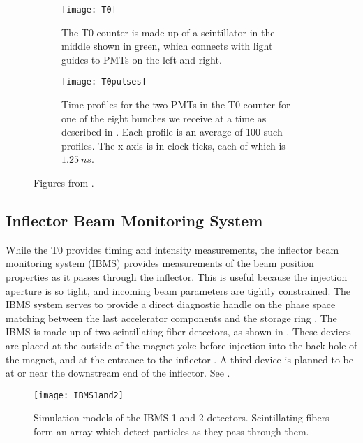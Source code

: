 \begin{figure}[]
\centering
    \begin{subfigure}[t]{0.45\textwidth}
        \centering
        \texttt{[image: T0]}
        \caption{The T0 counter is made up of a scintillator in the middle shown in green, which connects with light guides to PMTs on the left and right.}
    \label{fig:T0counter}
    \end{subfigure}%
    \hspace{1cm}
    \begin{subfigure}[t]{0.45\textwidth}
        \centering
        \texttt{[image: T0pulses]}
        \caption{Time profiles for the two PMTs in the T0 counter for one of the eight bunches we receive at a time as described in . Each profile is an average of 100 such profiles. The x axis is in clock ticks, each of which is $\SI{1.25}{ns}$.}
    \label{fig:T0pulses}    
    \end{subfigure}
\caption[T0 counter and pulses]{Figures from .}
\label{fig:T0}
\end{figure}


\subsection{Inflector Beam Monitoring System}
\label{sec:IBMS}

While the T0 provides timing and intensity measurements, the inflector beam monitoring system (IBMS) provides measurements of the beam position properties as it passes through the inflector. This is useful because the injection aperture is so tight, and incoming beam parameters are tightly constrained. The IBMS system serves to provide a direct diagnostic handle on the phase space matching between the last accelerator components and the \gmtwo storage ring \cite{ibms1}. The IBMS is made up of two scintillating fiber detectors, as shown in . These devices are placed at the outside of the magnet yoke before injection into the back hole of the magnet, and at the entrance to the inflector \cite{ibms2}. A third device is planned to be at or near the downstream end of the inflector. See . 


\begin{figure}[]
    \centering
    \texttt{[image: IBMS1and2]}
    \caption[IBMS Models]{Simulation models of the IBMS 1 and 2 detectors. Scintillating fibers form an array which detect particles as they pass through them.}   
    \label{fig:IBMS1and2}
\end{figure}

